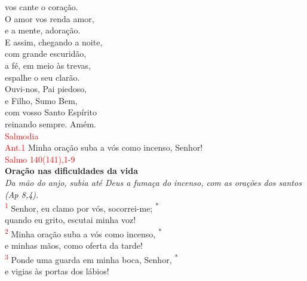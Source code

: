 \documentclass{book}
\begin{document}
\begin{center}
    vos cante o coração. \\
    O amor vos renda amor, \\
    e a mente, adoração.
    \vspace{.2cm} \\
    E assim, chegando a noite, \\
    com grande escuridão, \\
    a fé, em meio às trevas, \\
    espalhe o seu clarão.
    \vspace{.2cm} \\
    Ouvi-nos, Pai piedoso, \\
    e Filho, Sumo Bem, \\
    com vosso Santo Espírito \\
    reinando sempre. Amém.
    \vspace{.2cm} \\
    \textcolor{red}{Salmodia}
    \vspace{.2cm} \\
    \textcolor{red}{Ant.1} Minha oração suba a vós como incenso, Senhor!
    \vspace{.2cm} \\
    \textcolor{red}{Salmo 140(141),1-9}
    \vspace{.2cm} \\
    \textbf{Oração nas dificuldades da vida} \\
    \textit{Da mão do anjo, subia até Deus a fumaça do incenso, com as orações dos santos (Ap 8,4).}
    \vspace{.2cm} \\
    \textsuperscript{\underline{\hspace{.07in}}\textcolor{red}{1}} Senhor, eu clamo por vós, socorrei-me; \textsuperscript{*} \\
    quando eu grito, escutai minha voz! \\
    \textsuperscript{\underline{\hspace{.07in}}\textcolor{red}{2}} Minha oração suba a vós como incenso, \textsuperscript{*} \\
    e minhas mãos, como oferta da tarde!
    \vspace{.2cm} \\
    \textsuperscript{\underline{\hspace{.07in}}\textcolor{red}{3}} Ponde uma guarda em minha boca, Senhor, \textsuperscript{*} \\
    e vigias às portas dos lábios! \textsuperscript{\underline{\hspace{.07in}}}

\end{center}
\end{document}
